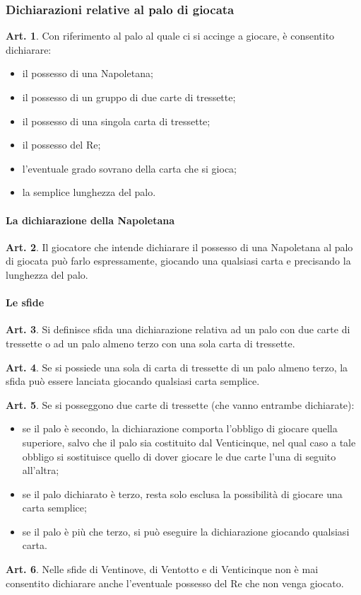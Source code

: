\documentclass[italian,a4paper]{article}
\theoremstyle{definition}
\newtheorem{art}{Art.}
\newenvironment{packeditem}{
\begin{itemize}
  \setlength{\itemsep}{1pt}
  \setlength{\parskip}{0pt}
  \setlength{\parsep}{0pt}
}{\end{itemize}}
\begin{document}
\subsubsection{Dichiarazioni relative al palo di giocata}
\begin{art}
    Con riferimento al palo al quale ci si accinge a giocare, è consentito dichiarare:
    \begin{packeditem}
\item      il possesso di una Napoletana;
\item      il possesso di un gruppo di due carte di tressette;
\item      il possesso di una singola carta di tressette;
\item      il possesso del Re;
\item      l'eventuale grado sovrano della carta che si gioca;
\item        la semplice lunghezza del palo.
    \end{packeditem}
\end{art}
\paragraph{La dichiarazione della Napoletana}
\begin{art}
    Il giocatore che intende dichiarare il possesso di una Napoletana al palo di giocata può farlo espressamente, giocando una qualsiasi carta e precisando la lunghezza del palo.
\end{art}
\paragraph{Le sfide}
\begin{art}
    Si definisce sfida una dichiarazione relativa ad un palo con due carte di tressette o ad un palo almeno terzo con una sola carta di tressette.
\end{art}
\begin{art}
    Se si possiede una sola di carta di tressette di un palo almeno terzo, la sfida può essere lanciata giocando qualsiasi carta semplice.
\end{art}
\begin{art}
    Se si posseggono due carte di tressette (che vanno entrambe dichiarate):
    \begin{packeditem}
\item se il palo è secondo, la dichiarazione comporta l'obbligo di giocare quella superiore, salvo che il palo sia costituito dal Venticinque, nel qual caso a tale obbligo si sostituisce quello di dover giocare le due carte l'una di seguito all'altra;
\item se il palo dichiarato è terzo, resta solo esclusa la possibilità di giocare una carta semplice;
\item  se il palo è più che terzo, si può eseguire la dichiarazione giocando qualsiasi carta. 
    \end{packeditem}
\end{art}
\begin{art}
    Nelle sfide di Ventinove, di Ventotto e di Venticinque non è mai consentito dichiarare anche l'eventuale possesso del Re che non venga giocato.
\end{art}
\end{document}
